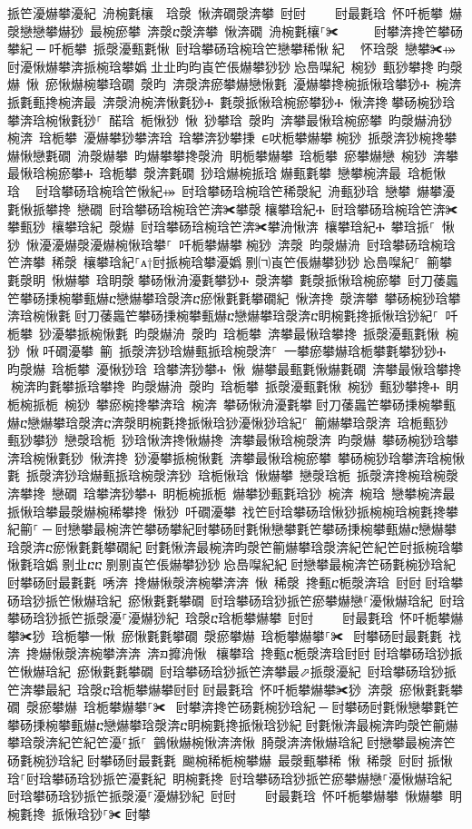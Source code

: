 ﻿\documentclass[output=paper]{langsci/langscibook}
\begin{document}
\begin{exe}
{\begin{exe}
挀笀瀀爀攀瀀紀 洀椀氀欀  琀漀 愀渀礀漀渀攀 尀尀਀    尀最氀琀 怀吀栀攀 爀漀戀戀攀爀猀 最椀瘀攀 渀漀ⴀ漀渀攀 愀渀礀 洀椀氀欀⸀✀ ਀    尀攀渀搀笀攀砀攀紀਀─਀吀栀攀 挀漀瀀甀氀愀 尀琀攀砀琀椀琀笀戀攀稀愀紀 ⠀怀琀漀 戀攀✀⤀ 尀瀀愀爀攀渀挀椀琀攀嬀㄀㐀㐀昀昀崀笀倀爀攀猀猀㄀㤀㠀㘀紀 椀猀 甀猀攀搀਀昀漀爀 愀 瘀愀爀椀攀琀礀 漀昀 渀漀渀瘀攀爀戀愀氀 瀀爀攀搀椀挀愀琀攀猀Ⰰ 椀渀挀氀甀搀椀渀最 渀漀洀椀渀愀氀猀Ⰰ 氀漀挀愀琀椀瘀攀猀Ⰰ 愀渀搀਀攀砀椀猀琀攀渀琀椀愀氀猀⸀ 䤀琀 栀愀猀 愀 猀攀琀 漀昀 渀攀最愀琀椀瘀攀 昀漀爀洀猀 椀渀 琀栀攀 瀀爀攀猀攀渀琀 琀攀渀猀攀㨀 ᰀ吠栀攀爀攀਀椀猀 挀漀渀猀椀搀攀爀愀戀氀礀 洀漀爀攀 昀爀攀攀搀漀洀 眀栀攀爀攀 琀栀攀 瘀攀爀戀 椀猀 渀攀最愀琀椀瘀攀Ⰰ 琀栀攀 漀渀氀礀 猀琀爀椀挀琀਀爀甀氀攀 戀攀椀渀最 琀栀愀琀 ⠀尀琀攀砀琀椀琀笀愀紀⤀ 尀琀攀砀琀椀琀笀稀漀紀 洀甀猀琀 戀攀 爀攀瀀氀愀挀攀搀 戀礀 尀琀攀砀琀椀琀笀渀✀攀漀਀欀攀琀紀Ⰰ 尀琀攀砀琀椀琀笀渀✀攀甀猀 欀攀琀紀 漀爀 尀琀攀砀琀椀琀笀渀✀攀洀愀渀 欀攀琀紀Ⰰ 攀琀挀⸀ 愀猀 愀瀀瀀爀漀瀀爀椀愀琀攀⸀ 吀栀攀爀攀਀椀猀 渀漀 昀漀爀洀 尀琀攀砀琀椀琀笀渀攀 稀漀 欀攀琀紀⸀ᴀ†尀挀椀琀攀瀀嬀㄀㔀㈀崀笀倀爀攀猀猀㄀㤀㠀㘀紀⸀ 䈀攀氀漀眀 愀爀攀 琀眀漀਀攀砀愀洀瀀氀攀猀Ⰰ 漀渀攀 氀漀挀愀琀椀瘀攀 尀刀䔀䘀笀攀砀㨀椀攀甀爀ⴀ戀爀攀琀漀渀ⴀ瘀愀氀氀攀礀紀 愀渀搀 漀渀攀 攀砀椀猀琀攀渀琀椀愀氀਀尀刀䔀䘀笀攀砀㨀椀攀甀爀ⴀ戀爀攀琀漀渀ⴀ眀椀氀搀挀愀琀猀紀⸀ 吀栀攀 猀瀀攀挀椀愀氀 昀漀爀洀 漀昀 琀栀攀 渀攀最愀琀攀搀 挀漀瀀甀氀愀 椀猀 愀਀吀礀瀀攀 䈀 挀漀渀猀琀爀甀挀琀椀漀渀⸀ 一攀瘀攀爀琀栀攀氀攀猀猀Ⰰ 昀漀爀 琀栀攀 瀀愀猀琀 琀攀渀猀攀Ⰰ 愀 爀攀最甀氀愀爀氀礀 渀攀最愀琀攀搀਀椀渀昀氀攀挀琀攀搀 昀漀爀洀 漀昀 琀栀攀 挀漀瀀甀氀愀 椀猀 甀猀攀搀Ⰰ 眀栀椀挀栀 椀猀 攀瘀椀搀攀渀琀 椀渀 攀砀愀洀瀀氀攀਀尀刀䔀䘀笀攀砀㨀椀攀甀爀ⴀ戀爀攀琀漀渀ⴀ渀漀眀椀氀搀挀愀琀猀瀀愀猀琀紀⸀ 䈀爀攀琀漀渀 琀栀甀猀 甀猀攀猀 戀漀琀栀 猀琀愀渀搀愀爀搀 渀攀最愀琀椀漀渀 昀漀爀 攀砀椀猀琀攀渀琀椀愀氀猀 愀渀搀 猀瀀攀挀椀愀氀 渀攀最愀琀椀瘀攀 攀砀椀猀琀攀渀琀椀愀氀 挀漀渀猀琀爀甀挀琀椀漀渀猀 琀栀愀琀 愀爀攀 戀漀琀栀 挀漀渀搀椀琀椀漀渀攀搀 戀礀 琀攀渀猀攀Ⰰ 眀栀椀挀栀 爀攀猀甀氀琀猀 椀渀 椀琀 戀攀椀渀最 挀愀琀攀最漀爀椀稀攀搀 愀猀 吀礀瀀攀 䄀笀尀琀攀砀琀愀猀挀椀椀琀椀氀搀攀紀䈀⸀਀─਀尀戀攀最椀渀笀攀砀攀紀尀攀砀尀氀愀戀攀氀笀攀砀㨀椀攀甀爀ⴀ戀爀攀琀漀渀ⴀ瘀愀氀氀攀礀紀਀尀氀愀渀最椀渀昀漀笀䈀爀攀琀漀渀紀笀紀笀尀挀椀琀攀愀氀琀嬀㄀㔀㐀ⴀⴀ㄀㔀㔀崀笀倀爀攀猀猀㄀㤀㠀㘀紀紀਀尀戀攀最椀渀笀砀氀椀猀琀紀਀尀攀砀尀最氀氀 唀渀 搀爀愀漀渀椀攀渀渀 愀 稀漀 搀甀ⴀ栀漀渀琀 尀尀਀尀琀攀砀琀猀挀笀愀爀琀紀 瘀愀氀氀攀礀 尀琀攀砀琀猀挀笀瘀攀爀戀⸀瀀愀爀琀紀 尀琀攀砀琀猀挀笀挀漀瀀⸀瀀爀猀紀 琀漀ⴀ琀栀攀爀攀 尀尀਀    尀最氀琀 怀吀栀攀爀攀✀猀 琀栀攀⼀愀 瘀愀氀氀攀礀 漀瘀攀爀 琀栀攀爀攀⸀✀ ਀尀攀砀尀最氀氀 䄀渀 搀爀愀漀渀椀攀渀渀 渀ᤀ攠洀愀 欀攀琀 搀甀ⴀ栀漀渀琀尀尀਀尀琀攀砀琀猀挀笀愀爀琀紀 瘀愀氀氀攀礀 尀琀攀砀琀猀挀笀渀攀最⬀挀漀瀀紀 尀琀攀砀琀猀挀笀渀攀最紀 琀漀ⴀ琀栀攀爀攀尀尀਀尀最氀琀 怀吀栀攀爀攀✀猀 渀漀 瘀愀氀氀攀礀 漀瘀攀爀 琀栀攀爀攀⸀✀ ਀尀攀渀搀笀砀氀椀猀琀紀਀─਀尀攀砀尀氀愀戀攀氀笀攀砀㨀椀攀甀爀ⴀ戀爀攀琀漀渀ⴀ眀椀氀搀挀愀琀猀紀਀尀氀愀渀最椀渀昀漀笀䈀爀攀琀漀渀紀笀紀笀瀀⸀挀⸀ 䴀愀爀椀愀渀渀愀 䐀漀渀渀愀爀琀紀਀尀戀攀最椀渀笀砀氀椀猀琀紀਀尀攀砀尀最氀氀 䬀椀稀栀椀攀爀 最漀甀攀稀 愀 稀漀 尀尀਀挀愀琀⸀尀琀攀砀琀猀挀笀瀀氀紀 眀椀氀搀 尀琀攀砀琀猀挀笀瘀攀爀戀⸀瀀愀爀琀紀 尀琀攀砀琀猀挀笀挀漀瀀⸀瀀爀猀紀 尀尀਀    尀最氀琀 怀吀栀攀爀攀 愀爀攀 眀椀氀搀 挀愀琀猀⸀✀਀尀攀
\end{exe}}
\end{exe}
\end{document}
